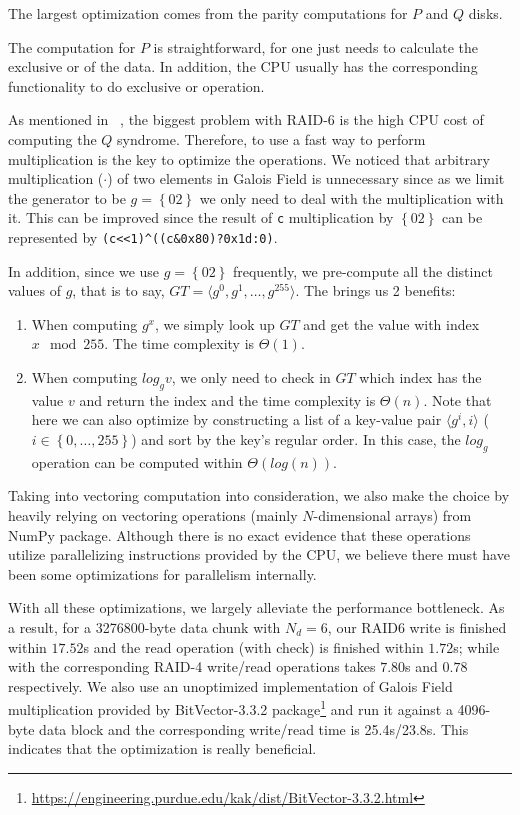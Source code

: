 The largest optimization comes from the parity computations for $P$ and $Q$ disks.

The computation for $P$ is straightforward, for one just needs to calculate the exclusive or of the data. In addition, the CPU usually has the corresponding functionality to do exclusive or operation.

As mentioned in ~\cite{raid6math}, the biggest problem with RAID-6 is the high CPU cost of computing the $Q$ syndrome. Therefore, to use a fast way to perform multiplication is the key to optimize the operations. We noticed that arbitrary multiplication ($\cdot$) of two elements in Galois Field is unnecessary since as we limit the generator to be $g=\left\{02\right\}$ we only need to deal with the multiplication with it. This can be improved since the result of \verb|c| multiplication by $\left\{02\right\}$ can be represented by \verb|(c<<1)^((c&0x80)?0x1d:0)|.

In addition, since we use $g=\left\{02\right\}$ frequently, we pre-compute all the distinct values of $g$, that is to say, $GT=\langle g^0, g^1, \ldots, g^{255}\rangle$. The brings us 2 benefits:

\begin{enumerate}
	\item When computing $g^{x}$, we simply look up $GT$ and get the value with index $x \mod 255$. The time complexity is $\Theta(1)$.
    \item When computing $log_{g}v$, we only need to check in $GT$ which index has the value $v$ and return the index and the time complexity is $\Theta(n)$. Note that here we can also optimize by constructing a list of a key-value pair $\langle g^{i}, i\rangle$ ($i\in\left\{0,\ldots,255\right\}$) and sort by the key's regular order. In this case, the $log_{g}$ operation can be computed within $\Theta(log{(n)})$.
\end{enumerate}

Taking into vectoring computation into consideration, we also make the choice by heavily relying on vectoring operations (mainly $N$-dimensional arrays) from NumPy package. Although there is no exact evidence that these operations utilize parallelizing instructions provided by the CPU, we believe there must have been some optimizations for parallelism internally.

With all these optimizations, we largely alleviate the performance bottleneck. As a result, for a 3276800-byte data chunk with $N_d=6$, our RAID6 write is finished within $17.52$s and the read operation (with check) is finished within $1.72$s; while with the corresponding RAID-4 write/read operations takes $7.80$s and $0.78$ respectively. We also use an unoptimized implementation of Galois Field multiplication provided by BitVector-3.3.2 package\footnote{\url{https://engineering.purdue.edu/kak/dist/BitVector-3.3.2.html}} and run it against a 4096-byte data block and the corresponding write/read time is 25.4s/23.8s. This indicates that the optimization is really beneficial.


